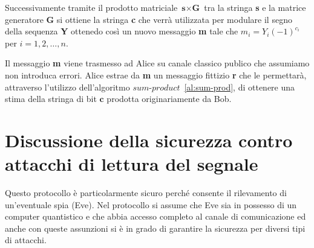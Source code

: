 Successivamente tramite il prodotto matriciale $\textbf{s} \times \textbf{G}$ tra la stringa \textbf{s} e la matrice generatore \textbf{G} si ottiene la stringa \textbf{c} che verr\`a utilizzata per modulare il segno della sequenza \textbf{Y} ottenedo cos\`i un nuovo messaggio \textbf{m} tale che $m_i = Y_i(-1)^{c_i}$ per $i = 1,2,\dots,n$.




Il messaggio \textbf{m} viene trasmesso ad Alice su canale classico publico che assumiamo non introduca errori. Alice estrae da \textbf{m} un messaggio fittizio \textbf{r} che le permettar\`a, attraverso l'utilizzo dell'algoritmo $\textit{sum-product}$~\ref{al:sum-prod}, di ottenere una stima della stringa di bit $\textbf{c}$ prodotta originariamente da Bob.

\section{Discussione della sicurezza contro attacchi di lettura del segnale}
Questo protocollo \`e particolarmente sicuro perch\'e consente il rilevamento di un'eventuale spia (Eve). Nel protocollo si assume che Eve sia in possesso di un computer quantistico e che abbia accesso completo al canale di comunicazione ed anche con queste assunzioni si \`e in grado di garantire la sicurezza per diversi tipi di attacchi.

